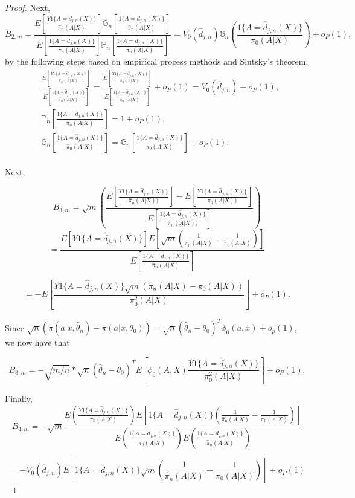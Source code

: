 \documentclass{article}
\begin{document}
\begin{proof}
Next,
 $$B_{2,m}=\frac{E[\frac{Y1\{A=\hat{d}_{j,n}(X)\}}{\hat{\pi}_n(A|X)}] \mathbb{G}_{n}[\frac{1\{A=\hat{d}_{j,n}(X)\}}{\hat{\pi}_n(A|X)}]}
    {E[\frac{1\{A=\hat{d}_{j,n}(X)\}}{\hat{\pi}_n(A|X)}] \mathbb{P}_{n}[\frac{1\{A=\hat{d}_{j,n}(X)\}}{\hat{\pi}_n(A|X)}]} 
    =  V_0(\hat{d}_{j,n}) \mathbb{G}_{n} (\frac{1\{A=\hat{d}_{j,n}(X)\}}{\pi_0(A|X)})+o_P(1),$$
    by the following steps based on empirical process methods and Slutsky's theorem:\\

\begin{align*} 
& \frac{E[\frac{Y1\{A=\hat{d}_{j,n}(X)\}}{\hat{\pi}_n(A|X)}]}{E[\frac{1\{A=\hat{d}_{j,n}(X)\}}{\hat{\pi}_n(A|X)}]} 
     =\frac{E[\frac{Y1\{A=\hat{d}_{j,n}(X)\}}{\pi_0(A|X)}]}{E[\frac{1\{A=\hat{d}_{j,n}(X)\}}{\pi_0(A|X)}]}+o_P(1)
    =V_0(\hat{d}_{j,n}) +o_P(1), \\
 & \mathbb{P}_{n}[\frac{1\{A=\hat{d}_{j,n}(X)\}}{\hat{\pi}_n(A|X)}] =1+o_P(1),\\
 & \mathbb{G}_{n}[\frac{1\{A=\hat{d}_{j,n}(X)\}}{\hat{\pi}_n(A|X)}] = \mathbb{G}_{n}[\frac{1\{A=\hat{d}_{j,n}(X)\}}{\pi_0(A|X)}] +o_P(1).
\end{align*}
\\
Next,
     
    $$B_{3,m}=\sqrt{m}\left(\frac{E[\frac{Y 1\{A=\hat{d}_{j,n}(X)\}}{\hat{\pi}_n(A|X))}]-E[\frac{Y 1\{A=\hat{d}_{j,n}(X)\}}{\pi_0(A|X))}]}{E[\frac{1\{A=\hat{d}_{j,n}(X)\}}{\hat{\pi}_n(A|X))}]}\right)$$
    $$=\frac{E[Y1\{A=\hat{d}_{j,n}(X)\}] E[\sqrt{m}(\frac{1}{\hat{\pi}_n(A|X)}-\frac{1}{\pi_0(A|X)})]}
    {E[\frac{1\{A=\hat{d}_{j,n}(X)\}}{\hat{\pi}_n(A|X)}]}$$

      
    $$= - E[\frac{Y1\{A=\hat{d}_{j,n}(X)\}\sqrt{m}(\hat{\pi}_n(A|X)-\pi_0(A|X))}{\pi^2_0(A|X)}]+o_P(1).$$
  
    Since $\sqrt{n}(\pi(a|x,\hat{\theta}_n)-\pi(a|x,\theta_0))=\sqrt{n}(\hat{\theta}_n-\theta_0)^T\phi_0(a,x)+o_p(1)$, we now have that
    
    $$B_{3,m}=-\sqrt{m/n}*\sqrt{n}(\hat{\theta}_n-\theta_0)^T E [\phi_0(A,X)\frac{Y1\{A=\hat{d}_{j,n}(X)\}}{\pi_0^2(A|X)}]+o_P(1).$$

Finally,
    $$B_{4,m}=-\sqrt{m}\frac{
    E(\frac{Y1\{A=\hat{d}_{j,n}(X)\}}{\pi_0(A|X)})
    E[1\{A=\hat{d}_{j,n}(X)\}(\frac{1}{\hat{\pi}_n(A|X)}-\frac{1}{\pi_0(A|X)})]}
    {E(\frac{1\{A=\hat{d}_{j,n}(X)\}}{\pi_0(A|X)})
    E(\frac{1\{A=\hat{d}_{j,n}(X)\}}{\hat{\pi}_n(A|X)})}$$

    $$=-V_0(\hat{d}_{j,n})E[1\{A=\hat{d}_{j,n}(X)\}\sqrt{m}(\frac{1}{\hat{\pi}_n(A|X)}-\frac{1}{\pi_0(A|X)})]+o_P(1)$$


\end{proof}
\end{document}
